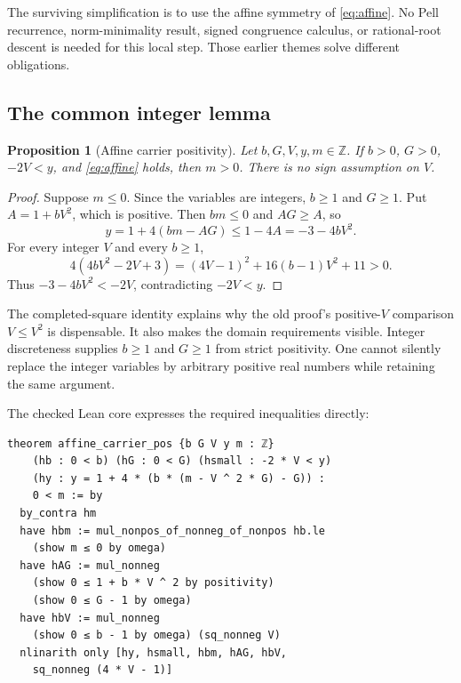 \documentclass[11pt,letterpaper]{article}
\newtheorem{proposition}{Proposition}
\begin{document}
The surviving simplification is to use the affine symmetry of \eqref{eq:affine}. No Pell recurrence, norm-minimality result, signed congruence calculus, or rational-root descent is needed for this local step. Those earlier themes solve different obligations.

\subsection{The common integer lemma}

\begin{proposition}[Affine carrier positivity]
Let $b,G,V,y,m\in\mathbb Z$. If $b>0$, $G>0$, $-2V<y$, and \eqref{eq:affine} holds, then $m>0$. There is no sign assumption on $V$.
\end{proposition}

\begin{proof}
Suppose $m\le0$. Since the variables are integers, $b\ge1$ and $G\ge1$. Put $A=1+bV^2$, which is positive. Then $bm\le0$ and $AG\ge A$, so
\[
 y=1+4(bm-AG)\le 1-4A=-3-4bV^2.
\]
For every integer $V$ and every $b\ge1$,
\begin{equation}
4(4bV^2-2V+3)
 =(4V-1)^2+16(b-1)V^2+11>0.
\label{eq:gap}
\end{equation}
Thus $-3-4bV^2<-2V$, contradicting $-2V<y$.
\end{proof}

The completed-square identity explains why the old proof's positive-$V$ comparison $V\le V^2$ is dispensable. It also makes the domain requirements visible. Integer discreteness supplies $b\ge1$ and $G\ge1$ from strict positivity. One cannot silently replace the integer variables by arbitrary positive real numbers while retaining the same argument.

The checked Lean core expresses the required inequalities directly:

\begin{Verbatim}[fontsize=\small,breaklines=true,samepage=true]
theorem affine_carrier_pos {b G V y m : ℤ}
    (hb : 0 < b) (hG : 0 < G) (hsmall : -2 * V < y)
    (hy : y = 1 + 4 * (b * (m - V ^ 2 * G) - G)) :
    0 < m := by
  by_contra hm
  have hbm := mul_nonpos_of_nonneg_of_nonpos hb.le
    (show m ≤ 0 by omega)
  have hAG := mul_nonneg
    (show 0 ≤ 1 + b * V ^ 2 by positivity)
    (show 0 ≤ G - 1 by omega)
  have hbV := mul_nonneg
    (show 0 ≤ b - 1 by omega) (sq_nonneg V)
  nlinarith only [hy, hsmall, hbm, hAG, hbV,
    sq_nonneg (4 * V - 1)]
\end{Verbatim}
\end{document}
